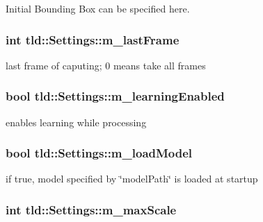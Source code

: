 Initial Bounding Box can be specified here. 

\hypertarget{classtld_1_1Settings_a4935fe002dd6358506813d7c48ec5322}{
\subsubsection[{m\-\_\-last\-Frame}]{\setlength{\rightskip}{0pt plus 5cm}int tld\-::\-Settings\-::m\-\_\-last\-Frame}}\label{classtld_1_1Settings_a4935fe002dd6358506813d7c48ec5322}


last frame of caputing; 0 means take all frames 

\hypertarget{classtld_1_1Settings_abd4a98a18a910313cf3590f507f1ceef}{
\subsubsection[{m\-\_\-learning\-Enabled}]{\setlength{\rightskip}{0pt plus 5cm}bool tld\-::\-Settings\-::m\-\_\-learning\-Enabled}}\label{classtld_1_1Settings_abd4a98a18a910313cf3590f507f1ceef}


enables learning while processing 

\hypertarget{classtld_1_1Settings_a6c06df5b2a9028a1c9a77269601f4a36}{
\subsubsection[{m\-\_\-load\-Model}]{\setlength{\rightskip}{0pt plus 5cm}bool tld\-::\-Settings\-::m\-\_\-load\-Model}}\label{classtld_1_1Settings_a6c06df5b2a9028a1c9a77269601f4a36}


if true, model specified by \char`\"{}model\-Path\char`\"{} is loaded at startup 

\hypertarget{classtld_1_1Settings_a548c317f8242ea8513d13573acdaaa4c}{
\subsubsection[{m\-\_\-max\-Scale}]{\setlength{\rightskip}{0pt plus 5cm}int tld\-::\-Settings\-::m\-\_\-max\-Scale}}\label{classtld_1_1Settings_a548c317f8242ea8513d13573acdaaa4c}


